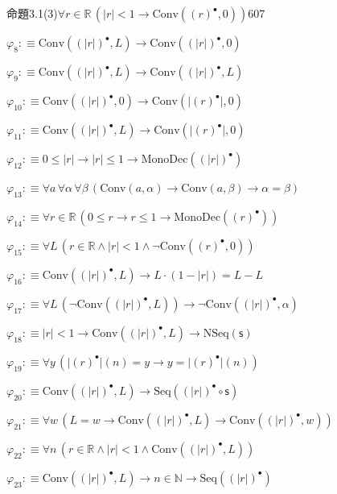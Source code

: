 \begin{fullproof}{命題3.1(3)}{$\forall r \in \mathbb{R}\,(\lvert r \rvert < 1 \to \mathrm{Conv}({(r)^{\bullet}},0))$}{607}
\begin{abbrevlist}
\item $\varphi_{8} :\equiv \mathrm{Conv}({(\lvert r \rvert)^{\bullet}},L) \to \mathrm{Conv}({(\lvert r \rvert)^{\bullet}},0)$
\item $\varphi_{9} :\equiv \mathrm{Conv}({(\lvert r \rvert)^{\bullet}},L) \to \mathrm{Conv}({(\lvert r \rvert)^{\bullet}},L)$
\item $\varphi_{10} :\equiv \mathrm{Conv}({(\lvert r \rvert)^{\bullet}},0) \to \mathrm{Conv}(\lvert {(r)^{\bullet}} \rvert,0)$
\item $\varphi_{11} :\equiv \mathrm{Conv}({(\lvert r \rvert)^{\bullet}},L) \to \mathrm{Conv}(\lvert {(r)^{\bullet}} \rvert,0)$
\item $\varphi_{12} :\equiv 0 \leq \lvert r \rvert \to \lvert r \rvert \leq 1 \to \mathrm{MonoDec}({(\lvert r \rvert)^{\bullet}})$
\item $\varphi_{13} :\equiv \forall a\,\forall \alpha\,\forall \beta\,(\mathrm{Conv}(a,\alpha) \to \mathrm{Conv}(a,\beta) \to \alpha = \beta)$
\item $\varphi_{14} :\equiv \forall r \in \mathbb{R}\,(0 \leq r \to r \leq 1 \to \mathrm{MonoDec}({(r)^{\bullet}}))$
\item $\varphi_{15} :\equiv \forall L\,(r \in \mathbb{R} \land \lvert r \rvert < 1 \land \neg \mathrm{Conv}({(r)^{\bullet}},0))$
\item $\varphi_{16} :\equiv \mathrm{Conv}({(\lvert r \rvert)^{\bullet}},L) \to L \cdot (1 - \lvert r \rvert) = L - L$
\item $\varphi_{17} :\equiv \forall L\,(\neg \mathrm{Conv}({(\lvert r \rvert)^{\bullet}},L)) \to \neg \mathrm{Conv}({(\lvert r \rvert)^{\bullet}},\alpha)$
\item $\varphi_{18} :\equiv \lvert r \rvert < 1 \to \mathrm{Conv}({(\lvert r \rvert)^{\bullet}},L) \to \mathrm{NSeq}(\mathsf{s})$
\item $\varphi_{19} :\equiv \forall y\,(\lvert {(r)^{\bullet}} \rvert(n) = y \to y = \lvert {(r)^{\bullet}} \rvert(n))$
\item $\varphi_{20} :\equiv \mathrm{Conv}({(\lvert r \rvert)^{\bullet}},L) \to \mathrm{Seq}({(\lvert r \rvert)^{\bullet}} \circ \mathsf{s})$
\item $\varphi_{21} :\equiv \forall w\,(L = w \to \mathrm{Conv}({(\lvert r \rvert)^{\bullet}},L) \to \mathrm{Conv}({(\lvert r \rvert)^{\bullet}},w))$
\item $\varphi_{22} :\equiv \forall n\,(r \in \mathbb{R} \land \lvert r \rvert < 1 \land \mathrm{Conv}({(\lvert r \rvert)^{\bullet}},L))$
\item $\varphi_{23} :\equiv \mathrm{Conv}({(\lvert r \rvert)^{\bullet}},L) \to n \in \mathbb{N} \to \mathrm{Seq}({(\lvert r \rvert)^{\bullet}})$

\end{abbrevlist}
\end{fullproof}
